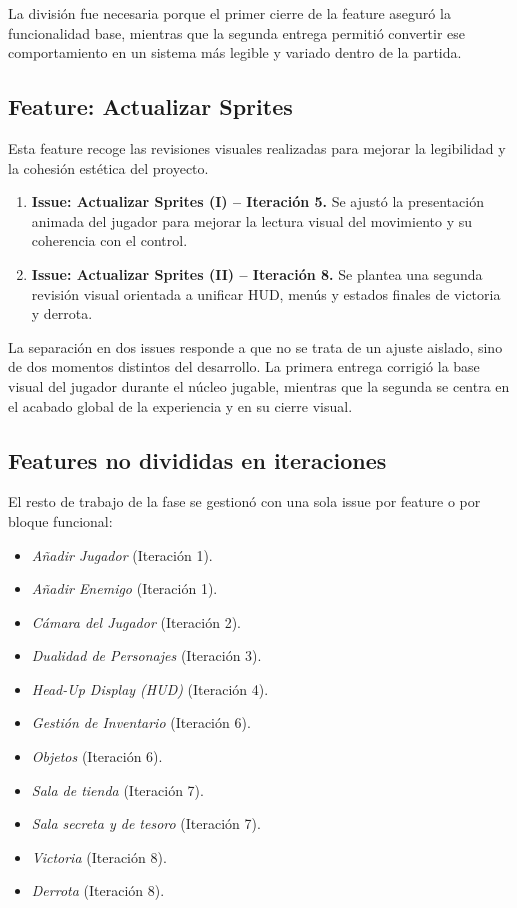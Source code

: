 La división fue necesaria porque el primer cierre de la feature aseguró la funcionalidad base, mientras que la segunda
entrega permitió convertir ese comportamiento en un sistema más legible y variado dentro de la partida.

\subsection{Feature: Actualizar Sprites}
Esta feature recoge las revisiones visuales realizadas para mejorar la legibilidad y la cohesión estética del proyecto.

\begin{enumerate}
\item \textbf{Issue: Actualizar Sprites (I) -- Iteración 5.} Se ajustó la presentación animada del jugador para mejorar la lectura visual del movimiento y su coherencia con el control.
\item \textbf{Issue: Actualizar Sprites (II) -- Iteración 8.} Se plantea una segunda revisión visual orientada a unificar HUD, menús y estados finales de victoria y derrota.
\end{enumerate}

La separación en dos issues responde a que no se trata de un ajuste aislado, sino de dos momentos distintos del desarrollo.
La primera entrega corrigió la base visual del jugador durante el núcleo jugable, mientras que la segunda se centra en el
acabado global de la experiencia y en su cierre visual.

\subsection{Features no divididas en iteraciones}
El resto de trabajo de la fase se gestionó con una sola issue por feature o por bloque funcional:

\begin{itemize}
\item \textit{Añadir Jugador} (Iteración 1).
\item \textit{Añadir Enemigo} (Iteración 1).
\item \textit{Cámara del Jugador} (Iteración 2).
\item \textit{Dualidad de Personajes} (Iteración 3).
\item \textit{Head-Up Display (HUD)} (Iteración 4).
\item \textit{Gestión de Inventario} (Iteración 6).
\item \textit{Objetos} (Iteración 6).
\item \textit{Sala de tienda} (Iteración 7).
\item \textit{Sala secreta y de tesoro} (Iteración 7).
\item \textit{Victoria} (Iteración 8).
\item \textit{Derrota} (Iteración 8).
\end{itemize}


